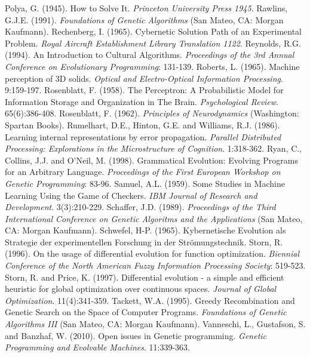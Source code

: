 \documentclass[spanish,a4paper,12pt,twoside]{report}
\begin{document}
\begin{thebibliography}{00}
   Polya, G. (1945). How to Solve It. \emph{Princeton University Press 1945}.
   Rawlins, G.J.E. (1991). \emph{Foundations of Genetic Algorithms} (San Mateo, CA: Morgan Kaufmann).
   Rechenberg, I. (1965). Cybernetic Solution Path of an Experimental Problem. \emph{Royal Aircraft Establishment Library Translation 1122}.
   Reynolds, R.G. (1994). An Introduction to Cultural Algorithms. \emph{Proceedings of the 3rd Annual Conference on Evolutionary Programming}: 131-139.
   Roberts, L. (1965). Machine perception of 3D solids. \emph{Optical and Electro-Optical Information Processing}. 9:159-197.
   Rosenblatt, F. (1958). The Perceptron: A Probabilistic Model for Information Storage and Organization in The Brain. \emph{Psychological Review}. 65(6):386-408.
   Rosenblatt, F. (1962). \emph{Principles of Neurodynamics} (Washington: Spartan Books). 
   Rumelhart, D.E., Hinton, G.E. and Williams, R.J. (1986). Learning internal representations by error propagation. \emph{Parallel Distributed Processing: Explorations in the Microstructure of Cognition}. 1:318-362.
   Ryan, C., Collins, J.J. and O'Neil, M. (1998). Grammatical Evolution: Evolving Programs for an Arbitrary Language. \emph{Proceedings of the First European Workshop on Genetic Programming}: 83-96.
   Samuel, A.L. (1959). Some Studies in Machine Learning Using the Game of Checkers. \emph{IBM Journal of Research and Development}. 3(3):210-229.
   Schaffer, J.D. (1989). \emph{Proceedings of the Third International Conference on Genetic Algoritms and the Applications} (San Mateo, CA: Morgan Kaufmann).
   Schwefel, H-P. (1965). Kybernetische Evolution als Strategie der experimentellen Forschung in der Strömungstechnik.
   Storn, R. (1996). On the usage of differential evolution for function optimization. \emph{Biennial Conference of the North American Fuzzy Information Processing Society}: 519-523.
   Storn, R. and Price, K. (1997). Differential evolution - a simple and efficient heuristic for global optimization over continuous spaces. \emph{Journal of Global Optimization}. 11(4):341-359.
   Tackett, W.A. (1995). Greedy Recombination and Genetic Search on the Space of Computer Programs. \emph{Foundations of Genetic Algorithms III} (San Mateo, CA: Morgan Kaufmann).
   Vanneschi, L., Gustafson, S. and Banzhaf, W. (2010). Open issues in Genetic programming. \emph{Genetic Programming and Evolvable Machines}. 11:339-363.

\end{thebibliography}
\end{document}
